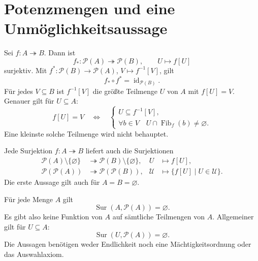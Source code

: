 \section{Potenzmengen und eine Unmöglichkeitsaussage}

\begin{theorem}
\label{b07guide:thm:powerset}
Sei $f\colon A\twoheadrightarrow B$. Dann ist
\[
 f_*\colon\mathcal P(A)\twoheadrightarrow\mathcal P(B),
 \qquad U\mapsto f[U]
\]
surjektiv. Mit
$f^*\colon\mathcal P(B)\to\mathcal P(A)$,
$V\mapsto f^{-1}[V]$, gilt
\[
 f_*\circ f^*=\operatorname{id}_{\mathcal P(B)}.
\]
Für jedes $V\subseteq B$ ist $f^{-1}[V]$ die größte
Teilmenge $U$ von $A$ mit $f[U]=V$.
Genauer gilt für $U\subseteq A$:
\[
 f[U]=V
 \quad\Longleftrightarrow\quad
 \left\{
 \begin{array}{l}
 U\subseteq f^{-1}[V],\\
 \forall b\in V\quad U\cap\operatorname{Fib}_f(b)\ne\varnothing.
 \end{array}\right.
\]
Eine kleinste solche Teilmenge wird nicht behauptet.
\end{theorem}

\begin{theorem}
\label{b07guide:thm:powersetiteration}
Jede Surjektion $f\colon A\twoheadrightarrow B$ liefert auch
die Surjektionen
\[
 \begin{aligned}
 \mathcal P(A)\setminus\{\varnothing\}
 &\twoheadrightarrow\mathcal P(B)\setminus\{\varnothing\},
 &U&\mapsto f[U],\\
 \mathcal P(\mathcal P(A))
 &\twoheadrightarrow\mathcal P(\mathcal P(B)),
 &\mathcal U&\mapsto\{f[U]\mid U\in\mathcal U\}.
 \end{aligned}
\]
Die erste Aussage gilt auch für $A=B=\varnothing$.
\end{theorem}

\begin{theorem}
\label{b07guide:thm:cantor}
Für jede Menge $A$ gilt
\[
 \operatorname{Sur}(A,\mathcal P(A))=\varnothing.
\]
Es gibt also keine Funktion von $A$ auf sämtliche Teilmengen von $A$.
Allgemeiner gilt für $U\subseteq A$:
\[
 \operatorname{Sur}(U,\mathcal P(A))=\varnothing.
\]
Die Aussagen benötigen weder Endlichkeit noch eine
Mächtigkeitsordnung oder das Auswahlaxiom.
\end{theorem}